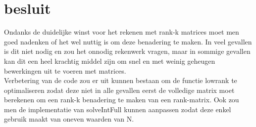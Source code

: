 \documentclass[a4paper]{article}
\begin{document}
\section*{besluit}

Ondanks de duidelijke winst voor het rekenen met rank-k matrices moet men goed nadenken of het wel nuttig is om deze benadering te maken. In veel gevallen is dit niet nodig en zou het onnodig rekenwerk vragen, maar in sommige gevallen kan dit een heel krachtig middel zijn om snel en met weinig geheugen bewerkingen uit te voeren met matrices. \\
Verbetering van de code zou er uit kunnen bestaan om de functie lowrank te optimaliseren zodat deze niet in alle gevallen eerst de volledige matrix moet berekenen om een rank-k benadering te maken van een rank-matrix. Ook zou men de implementatie van solveIntFull kunnen aanpassen zodat deze enkel gebruik maakt van oneven waarden van N.
\end{document}
